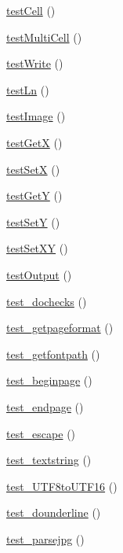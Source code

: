 \begin{DoxyCompactItemize}
\hyperlink{class_f_p_d_f_test_af8b8cbe99bd1f70247bcac12267a7356}{testCell} ()
\item 
\hyperlink{class_f_p_d_f_test_abb35a3a6e26a7be6e12ad78283fe7a11}{testMultiCell} ()
\item 
\hyperlink{class_f_p_d_f_test_a410c55a6fc67eb3b2d96573abafb4250}{testWrite} ()
\item 
\hyperlink{class_f_p_d_f_test_a8b6fbb3c5a332ae647f623fd783b54cf}{testLn} ()
\item 
\hyperlink{class_f_p_d_f_test_aab701e9639f8d39a44e7119e5f977d3f}{testImage} ()
\item 
\hyperlink{class_f_p_d_f_test_a728a3a25024a1c747d2ebe02263d946e}{testGetX} ()
\item 
\hyperlink{class_f_p_d_f_test_a5a6004c3fde570d963d892ee4dc0b4e7}{testSetX} ()
\item 
\hyperlink{class_f_p_d_f_test_a202891a4bb198875c2e7d3b942e14cc7}{testGetY} ()
\item 
\hyperlink{class_f_p_d_f_test_a3aaf68edd4178eb4336cf21fa8d22c59}{testSetY} ()
\item 
\hyperlink{class_f_p_d_f_test_a92e4ef8f52821707b9434fda01be5107}{testSetXY} ()
\item 
\hyperlink{class_f_p_d_f_test_a586f5a4dbe45e0768ba5de87f8eb2ee7}{testOutput} ()
\item 
\hyperlink{class_f_p_d_f_test_a38916d65d0bd2d42f450e40a06d2af92}{test\_\-dochecks} ()
\item 
\hyperlink{class_f_p_d_f_test_a61571a1cdac74d176cf09b62f524a22f}{test\_\-getpageformat} ()
\item 
\hyperlink{class_f_p_d_f_test_a5e436f4b2f2a2d6c39aae8f5c7e8e17d}{test\_\-getfontpath} ()
\item 
\hyperlink{class_f_p_d_f_test_a6c3b14d6f82e5d93b646f7453274446e}{test\_\-beginpage} ()
\item 
\hyperlink{class_f_p_d_f_test_a4c7e35ee3eff1848468670a8fe0584f1}{test\_\-endpage} ()
\item 
\hyperlink{class_f_p_d_f_test_ae48297271d11e1d52a1384855b89d3e9}{test\_\-escape} ()
\item 
\hyperlink{class_f_p_d_f_test_a26334b369d05385e241f4a661a2ed72f}{test\_\-textstring} ()
\item 
\hyperlink{class_f_p_d_f_test_aaf523c46d6eed2b648c2f70ff27d34bf}{test\_\-UTF8toUTF16} ()
\item 
\hyperlink{class_f_p_d_f_test_aa9e63b7f51c85fcb5b6150026e7c4307}{test\_\-dounderline} ()
\item 
\hyperlink{class_f_p_d_f_test_adb9be70e47ea84877ba349e4e991232e}{test\_\-parsejpg} ()

\end{DoxyCompactItemize}
